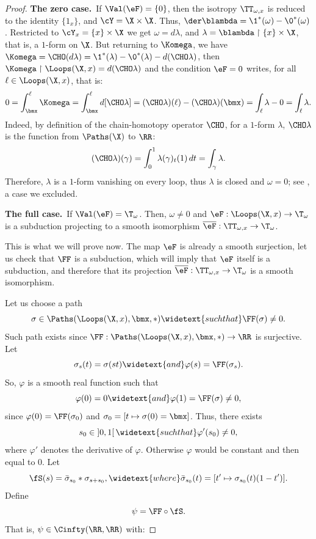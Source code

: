 \begin{proof}
    \textbf{The zero case.}~If $\Val(\eF) = \{0\}$,
    then the isotropy $\TT_{\omega,x}$ is reduced to the identity $\{1_x\}$,
    and $\cY = \X \times \X$.
    Thus,
    $\der \blambda = \1^*(\omega) - \0^*(\omega)$.
    Restricted to $\cY_x = \{x\} \times \X$ we get $\omega = d\lambda$,
    and $\lambda = \blambda \restriction \{x\} \times \X$,
    that is,
    a $1$-form on $\X$.
    But returning to $\Komega$,
    we have $\Komega = \CHO(d \lambda) = \1^*(\lambda) -\0^*(\lambda) - d(\CHO\lambda)$,
    then  $\Komega \restriction \Loops(\X,x) = d(\CHO\lambda)$ and the condition $\eF = 0$ writes,
    for all $\ell \in \Loops(\X,x)$,
    that is:
    $$
      0 = \int_\bmx^\ell \Komega = \int_\bmx^\ell d[\CHO\lambda] = (\CHO\lambda)(\ell) - (\CHO\lambda)(\bmx) = \int_\ell \lambda - 0 = \int_\ell \lambda.
      $$
    Indeed,
    by definition of the chain-homotopy operator $\CHO$,
    for a $1$-form $\lambda$,
    $\CHO\lambda$ is the function from $\Paths(\X)$ to $\RR$:
    $$
      (\CHO\lambda)(\gamma) = \int_0^1 \lambda(\gamma)_t(1)\, dt = \int_\gamma \lambda.
      $$
    Therefore,
    $\lambda$ is a $1$-form vanishing on every loop,
    thus $\lambda$ is closed and $\omega = 0$;
    see \cite[Ex. 118]{PIZ13},
    a case we excluded.
    
    \textbf{The full case.}~If $\Val(\eF) = \T_\omega$.
    Then,
    $\omega \neq 0$ and $\eF : \Loops(\X,x) \to \T_\omega$ is a subduction projecting to a smooth isomorphism $\overline\eF : \TT_{\omega,x} \to \T_\omega$.
    
    This is what we will prove now.
    The map $\eF$ is already a smooth surjection,
    let us check that $\FF$ is a subduction,
    which will imply that $\eF$ itself is a subduction,
    and therefore that its projection $\overline{\eF} : \TT_{\omega,x} \to \T_\omega$ is a smooth isomorphism.
    
    Let us choose a path
    $$
      \sigma \in \Paths(\Loops(\X,x),\bmx,\ast)
      \widetext{such that} \FF(\sigma) \neq 0.
      $$
    Such path exists since $\FF: \Paths(\Loops(\X,x),\bmx,\ast) \to \RR$ is surjective.
    Let
    $$
      \sigma_s(t) = \sigma(st)
      \widetext{and} \varphi(s) = \FF(\sigma_s).
      $$
    So,
    $\varphi$ is a smooth real function such that
    $$
      \varphi(0) = 0
      \widetext{and}
      \varphi(1) = \FF(\sigma) \neq 0,
      $$
    since $\varphi(0) = \FF(\sigma_0)$ and $\sigma_0 = [t \mapsto \sigma(0)=\bmx]$.
    Thus,
    there exists
    $$
      s_0 \in \left]0,1\right[
      \widetext{such that}
      \varphi'(s_0) \neq 0,
      $$
    where $\varphi'$ denotes the derivative of $\varphi$.
    Otherwise $\varphi$ would be constant and then equal to $0$.
    Let
    $$
      \fS(s) = \bar\sigma_{s_0} * \sigma_{s+s_0},
      \widetext{where}
      \bar\sigma_{s_0}(t) = [ t' \mapsto \sigma_{s_0}(t)(1-t')].
      $$
    Define
    $$
      \psi = \FF \circ \fS.
      $$
    That is,
    $\psi \in \Cinfty(\RR,\RR)$ with:
    

\end{proof}
